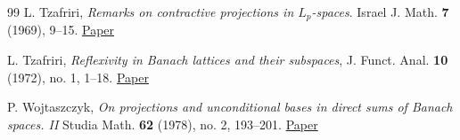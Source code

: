 \documentclass[11pt]{amsart}
\theoremstyle{definition}
\numberwithin{equation}{section}
\begin{document}
\begin{thebibliography}{99}
L. Tzafriri, \textit{Remarks on contractive projections in $L_p$-spaces}. Israel J. Math. \textbf{7} (1969), 9--15. \href{https://link.springer.com/article/10.1007/BF02771741}{Paper}


L. Tzafriri,
\textit{Reflexivity in Banach lattices and their subspaces},
J. Funct. Anal. \textbf{10} (1972), no. 1, 1--18. \href{https://www.sciencedirect.com/science/article/pii/0022123672900547}{Paper}

P. Wojtaszczyk, \textit{On projections and unconditional bases in direct sums of Banach spaces. II}
Studia Math. \textbf{62} (1978), no. 2, 193--201. \href{https://doi.org/10.4064/sm-62-2-193-201}{Paper}
    
\end{thebibliography}
\end{document}
